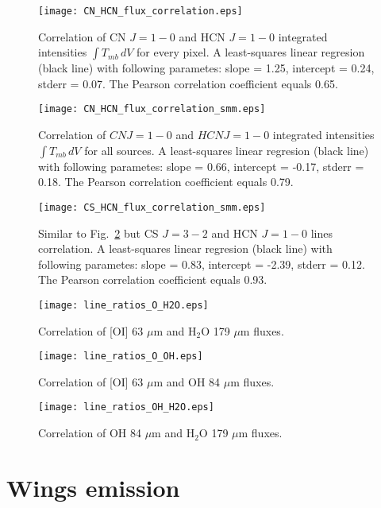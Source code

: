 \documentclass{aa}
\begin{document}
\begin{appendix}
\begin{figure}
\texttt{[image: CN\_HCN\_flux\_correlation.eps]}
\caption{Correlation of CN $J=1-0$ and HCN $J=1-0$ integrated intensities $\int{T_{mb} \, dV}$ for every pixel. A least-squares linear regresion (black line) with following parametes: slope = 1.25, intercept = 0.24, stderr = 0.07. The Pearson correlation coefficient equals 0.65. }
\label{CN_HCN_corr_all}
\end{figure}

\begin{figure}
\texttt{[image: CN\_HCN\_flux\_correlation\_smm.eps]}
\caption{Correlation of $CN J=1-0$ and $HCN J=1-0$ integrated intensities $\int{T_{mb} \, dV}$ for all sources. A least-squares linear regresion (black line) with following parametes: slope = 0.66, intercept = -0.17, stderr = 0.18. The Pearson correlation coefficient equals 0.79. }
\label{CN_HCN_corr_smm}
\end{figure}

\begin{figure}
\texttt{[image: CS\_HCN\_flux\_correlation\_smm.eps]}
\caption{Similar to Fig.~\ref{CN_HCN_corr_smm} but CS $J=3-2$ and HCN $J=1-0$ lines correlation. A least-squares linear regresion (black line) with following parametes: slope = 0.83, intercept = -2.39, stderr = 0.12. The Pearson correlation coefficient equals 0.93. }
\label{CS_HCN_corr_smm}
\end{figure}

\begin{figure}
\texttt{[image: line\_ratios\_O\_H2O.eps]}
\caption{Correlation of [OI] 63 $\mu$m and H$_2$O 179 $\mu$m fluxes.}
\label{h13cn10}
\end{figure}

\begin{figure}
\texttt{[image: line\_ratios\_O\_OH.eps]}
\caption{Correlation of [OI] 63 $\mu$m and OH 84 $\mu$m fluxes.}
\label{h13cn10}
\end{figure}

\begin{figure}
\texttt{[image: line\_ratios\_OH\_H2O.eps]}
\caption{Correlation of OH 84 $\mu$m and H$_2$O 179 $\mu$m fluxes.}
\label{h13cn10}
\end{figure}

\section{Wings emission}


\end{appendix}
\end{document}
